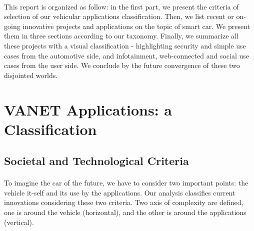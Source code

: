 \documentclass[a4paper]{article}
\begin{document}
\paragraph{}This report is organized as follow: in the first part, we present the criteria of selection of our vehicular applications classification. Then, we list recent or on-going innovative projects and applications on the topic of smart car. We present them in three sections according to our taxonomy. Finally, we summarize all these projects with a visual classification - highlighting security and simple use cases from the automotive side, and infotainment, web-connected and social use cases from the user side. We conclude by the future convergence of these two disjointed worlds.



 
 






















 \section{VANET Applications: a Classification}
\label{Classification}

\subsection{Societal and Technological Criteria}

\paragraph{}To imagine the car of the future, we have to consider two important points: the vehicle it-self and its use by the applications. Our analysis classifies current innovations considering these two criteria. Two axis of complexity are defined, one is around the vehicle (horizontal), and the other is around the applications (vertical). 
\end{document}
